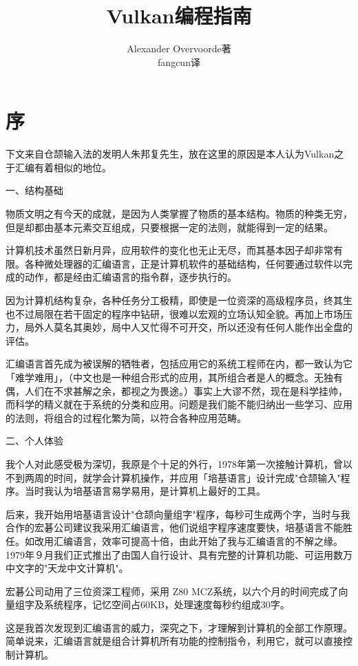 \documentclass{ctexart}
\title{Vulkan编程指南}
\author{Alexander Overvoorde著\\fangcun译}
\begin{document}
\maketitle
\newpage
\setcounter{tocdepth}{2}
\tableofcontents
\newpage
\section{序}
下文来自仓颉输入法的发明人朱邦复先生，放在这里的原因是本人认为Vulkan之于汇编有着相似的地位。

一、结构基础

物质文明之有今天的成就，是因为人类掌握了物质的基本结构。物质的种类无穷，但是却都由基本元素交互组成，只要根据一定的法则，就能得到一定的结果。

计算机技术虽然日新月异，应用软件的变化也无止无尽，而其基本因子却非常有限。各种微处理器的汇编语言，正是计算机软件的基础结构，任何要通过软件以完成的动作，都是经由汇编语言的指令群，逐步执行的。

因为计算机结构复杂，各种任务分工极精，即使是一位资深的高级程序员，终其生也不过局限在若干固定的程序中钻研，很难以宏观的立场认知全貌。再加上市场压力，局外人莫名其奥妙，局中人又忙得不可开交，所以还没有任何人能作出全盘的评估。

汇编语言首先成为被误解的牺牲者，包括应用它的系统工程师在内，都一致认为它「难学难用」，（中文也是一种组合形式的应用，其所组合者是人的概念。无独有偶，人们在不求甚解之余，都视之为畏途。）事实上大谬不然，现在是科学挂帅，而科学的精义就在于系统的分类和应用。问题是我们能不能归纳出一些学习、应用的法则，将组合的过程化繁为简，以符合各种应用范畴。

二、个人体验

我个人对此感受极为深切，我原是个十足的外行，1978年第一次接触计算机，曾以不到两周的时间，就学会计算机操作，并应用「培基语言」设计完成"仓颉输入"程序。当时我认为培基语言易学易用，是计算机上最好的工具。

后来，我开始用培基语言设计"仓颉向量组字"程序，每秒可生成两个字，当时与我合作的宏碁公司建议我采用汇编语言，他们说组字程序速度要快，培基语言不能胜任。如改用汇编语言，效率可提高十倍，由此开始了我与汇编语言的不解之缘。1979年９月我们正式推出了由国人自行设计、具有完整的计算机功能、可运用数万中文字的"天龙中文计算机"。

宏碁公司动用了三位资深工程师，采用 Z80 MCZ系统，以六个月的时间完成了向量组字及系统程序，记忆空间占60KB，处理速度每秒约组成30字。

这是我首次发现到汇编语言的威力，深究之下，才理解到计算机的全部工作原理。简单说来，汇编语言就是组合计算机所有功能的控制指令，利用它，就可以直接控制计算机。
\end{document}
